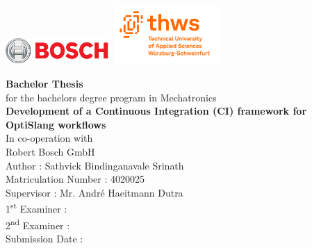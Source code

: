 \begin{titlepage}
    \par
    \includegraphics[width=0.3\textwidth, valign=M]{Logo/bosch_logo.png}
    \hfill
    \includegraphics[width=0.3\textwidth,valign=M]{Logo/Thws-logo_English.png}
    \par
    \vspace{3cm}
    \begin{center}
         \textbf{\Huge Bachelor Thesis}
         \vspace{5pt}
         \\
         for the bachelors degree program in Mechatronics
         \vspace{2.5cm}
         \\
         \textbf{\Huge Development of a Continuous Integration (CI) framework for OptiSlang workflows}
         \vspace{2cm}
         \\
         In co-operation with
         \vspace{5pt}
         \\
         Robert Bosch GmbH
         \vspace{2cm}
         \\
         Author : Sathvick Bindinganavale Srinath\\
         Matriculation Number : 4020025
         \vspace{1cm}\\
         Supervisor : Mr. André Haeitmann Dutra \\
         1\textsuperscript{st} Examiner : \\
         2\textsuperscript{nd} Examiner :
         \vspace{1cm} \\
         Submission Date : 
    \end{center}
\end{titlepage}